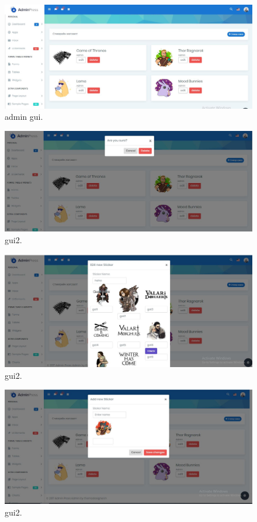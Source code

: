 \documentclass[12pt]{article}
\begin{document}
	\begin{figure}
	\includegraphics[width=\linewidth]{admin.jpg}
	\caption{admin gui.}
	\label{fig:erd}
\end{figure}
	\begin{figure}
	\includegraphics[width=\linewidth]{admindelete.jpg}
\caption{gui2.}
\label{fig:erd}
\end{figure}
	\begin{figure}
\includegraphics[width=\linewidth]{adminedit.jpg}
\caption{gui2.}
\label{fig:erd}
\end{figure}
	\begin{figure}
	\includegraphics[width=\linewidth]{adminadd.jpg}
	\caption{gui2.}
	\label{fig:erd}
\end{figure}
\end{document}
